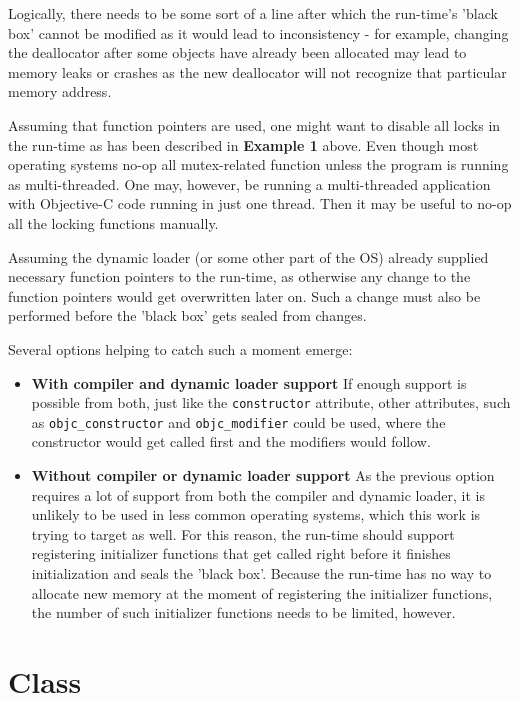 Logically, there needs to be some sort of a line after which the run-time's 'black box' cannot be modified as it would lead to inconsistency - for example, changing the deallocator after some objects have already been allocated may lead to memory leaks or crashes as the new deallocator will not recognize that particular memory address.

Assuming that function pointers are used, one might want to disable all locks in the run-time as has been described in \textbf{Example 1} above. Even though most operating systems no-op all mutex-related function unless the program is running as multi-threaded. One may, however, be running a multi-threaded application with Objective-C code running in just one thread. Then it may be useful to no-op all the locking functions manually.

Assuming the dynamic loader (or some other part of the OS) already supplied necessary function pointers to the run-time, as otherwise any change to the function pointers would get overwritten later on. Such a change must also be performed before the 'black box' gets sealed from changes.

Several options helping to catch such a moment emerge:

\begin{itemize}
  \item{\bf{With compiler and dynamic loader support}} If enough support is possible from both, just like the \verb=constructor= attribute, other attributes, such as \verb=objc_constructor= and \verb=objc_modifier= could be used, where the constructor would get called first and the modifiers would follow.
  \item{\bf{Without compiler or dynamic loader support}} As the previous option requires a lot of support from both the compiler and dynamic loader, it is unlikely to be used in less common operating systems, which this work is trying to target as well. For this reason, the run-time should support registering initializer functions that get called right before it finishes initialization and seals the 'black box'. Because the run-time has no way to allocate new memory at the moment of registering the initializer functions, the number of such initializer functions needs to be limited, however.
\end{itemize}

\section{Class}

